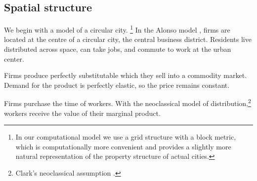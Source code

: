 \subsection{Spatial structure}

%  

We begin with a model of a circular city. \footnote{In our computational model we use a grid structure with  a block metric, which is computationally more convenient and provides a slightly more natural representation of the property structure of actual cities.} %
In the \gls{Alonso model} \cite{alonsoTheoryUrbanLand1960, alonsoLocationLandUse1964}, firms are located at the centre of a circular city, the central business district. Residents live distributed across space, can take jobs, and commute to work at the urban center. 

Firms produce perfectly \gls{substitutable} %
which they sell into a commodity market. Demand for the \gls{product} is \gls{perfectly elastic}, so the price remains constant. 

Firms purchase the time of workers. %
With the neoclassical model of distribution,\footnote{Clark's neoclassical assumption \cite{clarkDistributionWealthTheory1899}.} 
workers receive the value of their marginal product. 

 
